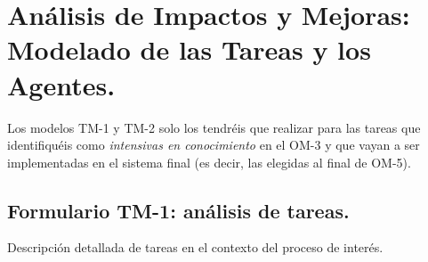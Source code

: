 \documentclass[12pt,a4paper,twoside,spanish]{article}      %
\begin{document}
\pagebreak
\section{Análisis de Impactos y Mejoras: Modelado de las Tareas y los Agentes.}

{\color{blue} Los modelos TM-1 y TM-2 solo los tendréis que realizar para las tareas que identifiquéis como \textit{intensivas en conocimiento} en el OM-3 y que vayan a ser implementadas en el sistema final (es decir, las elegidas al final de OM-5).}

\subsection{Formulario TM-1: análisis de tareas.}

{\color{blue}Descripción detallada de tareas en el contexto del proceso de interés.}
\end{document}
